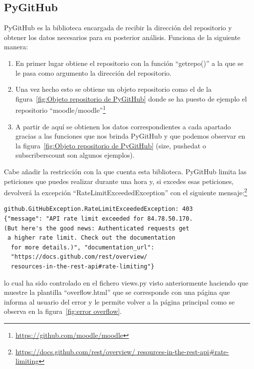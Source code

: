 \documentclass[a4paper, 12pt]{book}
\begin{document}
\subsection{PyGitHub}
PyGitHub es la biblioteca encargada de recibir la dirección del repositorio y obtener los datos necesarios para su posterior análisis. Funciona de la siguiente manera:
\begin{enumerate}
	\item En primer lugar obtiene el repositorio con la función ``get\textunderscore repo()'' a la que se le pasa como argumento la dirección del repositorio.
	\item Una vez hecho esto se obtiene un objeto repositorio como el de la figura~\ref{fig:Objeto repositorio de PyGitHub} donde se ha puesto de ejemplo el repositorio ``moodle/moodle''\footnote{\url{https://github.com/moodle/moodle}}
	\item A partir de aquí se obtienen los datos correspondientes a cada apartado gracias a las funciones que nos brinda PyGitHub y que podemos observar en la figura~\ref{fig:Objeto repositorio de PyGitHub} (size, pushed\textunderscore at o subscribers\textunderscore count son algunos ejemplos). 
\end{enumerate}
Cabe añadir la restricción con la que cuenta esta biblioteca. PyGitHub limita las peticiones que puedes realizar durante una hora y, si excedes esas peticiones, devolverá la excepción ``RateLimitExceededException'' con el siguiente mensaje:\footnote{\url{https://docs.github.com/rest/overview/
  resources-in-the-rest-api#rate-limiting}} \begin{verbatim}
github.GitHubException.RateLimitExceededException: 403 
{"message": "API rate limit exceeded for 84.78.50.170. 
(But here's the good news: Authenticated requests get
 a higher rate limit. Check out the documentation
  for more details.)", "documentation_url": 
  "https://docs.github.com/rest/overview/
  resources-in-the-rest-api#rate-limiting"} 
\end{verbatim} lo cual ha sido controlado en el fichero views.py visto anteriormente haciendo que muestre la plantilla ``overflow.html'' que se corresponde con una página que informa al usuario del error y le permite volver a la página principal como se observa en la figura~\ref{fig:error overflow}.
\end{document}
